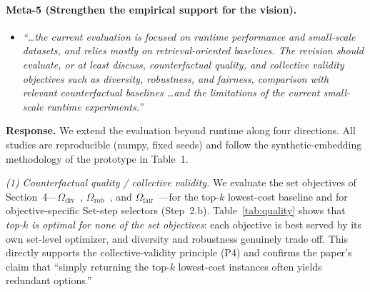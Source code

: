 \paragraph{Meta-5 (Strengthen the empirical support for the vision).}

\begin{itemize}[leftmargin=1.2em, itemsep=1pt, topsep=2pt]
\item \textit{``\dots the current evaluation is focused on runtime performance and small-scale datasets, and relies mostly on retrieval-oriented baselines. The revision should evaluate, or at least discuss, counterfactual quality, and collective validity objectives such as diversity, robustness, and fairness, comparison with relevant counterfactual baselines \dots and the limitations of the current small-scale runtime experiments.''}
\end{itemize}
\smallskip

\noindent\textbf{Response.}
We extend the evaluation beyond runtime along four directions. All studies are reproducible (numpy, fixed seeds) and follow the synthetic-embedding methodology of the prototype in Table~1.

\emph{(1) Counterfactual quality / collective validity.} We evaluate the set objectives of Section~4---$\Omega_{\text{div}}$~\cite{laugel2023achieving,borodin2017max}, $\Omega_{\text{rob}}$~\cite{guyomard2023generating}, and $\Omega_{\text{fair}}$~\cite{kusner2017counterfactual}---for the top-$k$ lowest-cost baseline and for objective-specific Set-step selectors (Step~2.b). Table~\ref{tab:quality} shows that \emph{top-$k$ is optimal for none of the set objectives}: each objective is best served by its own set-level optimizer, and diversity and robustness genuinely trade off. This directly supports the collective-validity principle (P4) and confirms the paper's claim that ``simply returning the top-$k$ lowest-cost instances often yields redundant options.''

